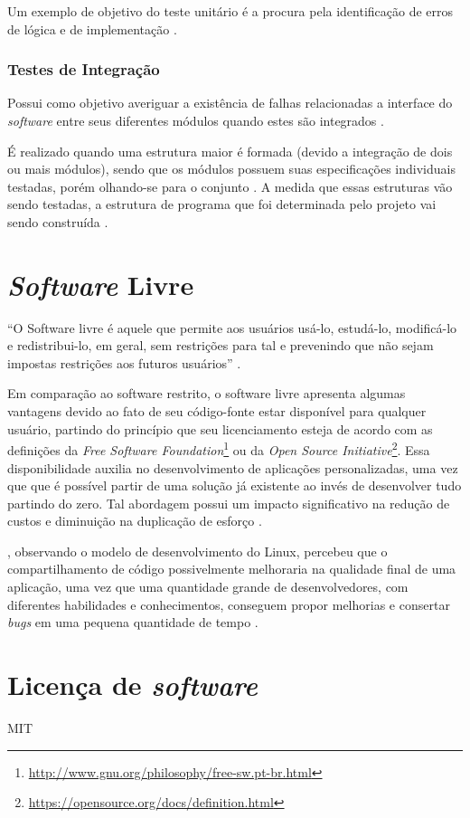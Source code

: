         Um exemplo de objetivo do teste unitário é a procura pela identificação de erros de lógica e de implementação \cite{maldonado}.

        \subsubsection{Testes de Integração}
        Possui como objetivo averiguar a existência de falhas relacionadas a interface do \textit{software} entre seus diferentes módulos quando estes são integrados \cite{artigo_intro_teste}.

        É realizado quando uma estrutura maior é formada (devido a integração de dois ou mais módulos), sendo que os módulos possuem suas especificações individuais testadas, porém olhando-se para o conjunto \cite{sw_test_tech}. A medida que essas estruturas vão sendo testadas, a estrutura de programa que foi determinada pelo projeto vai sendo construída \cite{maldonado}.

\section{\textit{Software} Livre}
``O Software livre é aquele que permite aos usuários usá-lo, estudá-lo, modificá-lo e redistribui-lo, em geral, sem restrições para tal e prevenindo que não sejam impostas restrições aos futuros usuários'' \cite{meirelles2013}.

Em comparação ao software restrito, o software livre apresenta algumas vantagens devido ao fato de seu código-fonte estar disponível para qualquer usuário, partindo do princípio que seu licenciamento esteja de acordo com as definições da \textit{Free Software Foundation}\footnote{\url{http://www.gnu.org/philosophy/free-sw.pt-br.html}} ou da \textit{Open Source Initiative}\footnote{\url{https://opensource.org/docs/definition.html}}. Essa disponibilidade auxilia no desenvolvimento de aplicações personalizadas, uma vez que que é possível partir de uma solução já existente ao invés de desenvolver tudo partindo do zero. Tal abordagem possui um impacto significativo na redução de custos e diminuição na duplicação de esforço \cite{meirelles2013}.

\cite{raymond1999}, observando o modelo de desenvolvimento do Linux, percebeu que o compartilhamento de código possivelmente melhoraria na qualidade final de uma aplicação, uma vez que uma quantidade grande de desenvolvedores, com diferentes habilidades e conhecimentos, conseguem propor melhorias e consertar \textit{bugs} em uma pequena quantidade de tempo \cite{meirelles2013}.

\section{Licença de \textit{software}}
MIT